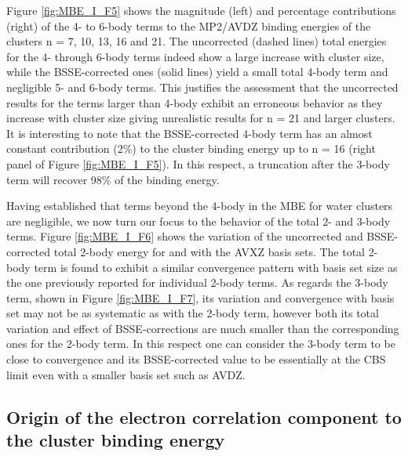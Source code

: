 \documentclass[11pt, proquest]{uwthesis}[2020/02/24]
\let\ce\ch
\newcommand{\textapprox}{\raisebox{0.5ex}{\texttildelow}}
\begin{document}
\par Figure \ref{fig:MBE_I_F5} shows the magnitude (left) and percentage contributions (right) of the 4- to 6-body terms to the MP2/AVDZ binding energies of the clusters n = 7, 10, 13, 16 and 21. The uncorrected (dashed lines) total energies for the 4- through 6-body terms indeed show a large increase with cluster size, while the BSSE-corrected ones (solid lines) yield a small total 4-body term and negligible 5- and 6-body terms. This justifies the assessment that the uncorrected results for the terms larger than 4-body exhibit an erroneous behavior as they increase with cluster size giving unrealistic results for n = 21 and larger clusters. It is interesting to note that the BSSE-corrected 4-body term has an almost constant contribution (\textapprox2\%) to the cluster binding energy up to n = 16 (right panel of Figure \ref{fig:MBE_I_F5}). In this respect, a truncation after the 3-body term will recover \textapprox98\% of the binding energy.

\par Having established that terms beyond the 4-body in the MBE for water clusters are negligible, we now turn our focus to the behavior of the total 2- and 3-body terms. Figure \ref{fig:MBE_I_F6} shows the variation of the uncorrected and BSSE-corrected total 2-body energy for \ce{(H2O)7} and \ce{(H2O)_{10}} with the AVXZ basis sets. The total 2-body term is found to exhibit a similar convergence pattern with basis set size as the one previously reported for individual 2-body terms.\autocite{xantheas_ab_1994,dunning_road_2000,miliordos_n_2015,miliordos_benchmark_2014} As regards the 3-body term, shown in Figure \ref{fig:MBE_I_F7}, its variation and convergence with basis set may not be as systematic as with the 2-body term, however both its total variation and effect of BSSE-corrections are much smaller than the corresponding ones for the 2-body term. In this respect one can consider the 3-body term to be close to convergence and its BSSE-corrected value to be essentially at the CBS limit even with a smaller basis set such as AVDZ.

\subsection{Origin of the electron correlation component to the cluster binding energy}
\end{document}

